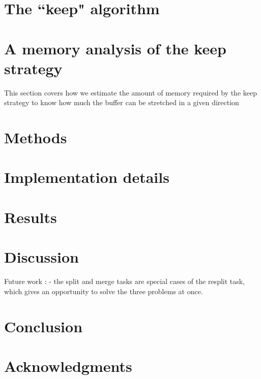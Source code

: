 \documentclass[conference]{IEEEtran}
\begin{document}
\section{The ``keep" algorithm}

\section{A memory analysis of the keep strategy}
This section covers how we estimate the amount of memory required by the keep
strategy to know how much the buffer can be stretched in a given direction

\section{Methods}

\section{Implementation details}

\section{Results}

\section{Discussion}

Future work :
- the split and merge tasks
are special cases of the resplit task, which gives an opportunity to solve
the three problems at once.

\section{Conclusion}

\section{Acknowledgments}



\end{document}
